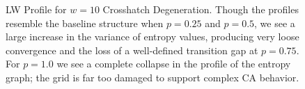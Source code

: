 \documentclass[a4paper,11pt]{article}
\begin{document}
\begin{figure}[htp]
\caption[Crosshatch Langton-Wootters Profile, $w=10$]{
  LW Profile for $w=10$ Crosshatch Degeneration. Though the profiles resemble the baseline structure when $p=0.25$ and $p=0.5$, we see a large increase in the variance of entropy values, producing very loose convergence and the loss of a well-defined transition gap at $p=0.75$. For $p=1.0$ we see a complete collapse in the profile of the entropy graph; the grid is far too damaged to support complex CA behavior.
}
\label{fig:lw_ch_10}
\end{figure}






\end{document}
